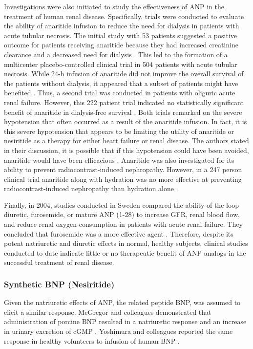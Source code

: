 \documentclass[14pt,a4paper,onecolumn]{extarticle}
\begin{document}
Investigations were also initiated to study the effectiveness of ANP in the treatment of human renal disease. Specifically, trials were conducted to evaluate the ability of anaritide infusion to reduce the need for dialysis in patients with acute tubular necrosis. The initial study with 53 patients suggested a positive outcome for patients receiving anaritide because they had increased creatinine clearance and a decreased need for dialysis \citep{Rahman1994}. This led to the formation of a multicenter placebo-controlled clinical trial in 504 patients with acute tubular necrosis. While 24-h infusion of anaritide did not improve the overall survival of the patients without dialysis, it appeared that a subset of patients might have benefited \citep{Allgren1997}.
Thus, a second trial was conducted in patients with oliguric acute renal failure. However, this 222 patient trial indicated no statistically significant benefit of anaritide in dialysis-free survival \citep{Lewis2000}. Both trials remarked on the severe hypotension that often occurred as a result of the anaritide infusion. In fact, it is this severe hypotension that appears to be limiting the utility of anaritide or nesiritide as a therapy for either heart failure or renal disease. The authors stated in their discussion, it is possible that if this hypotension could have been avoided, anaritide would have been efficacious \citep{Lewis2000}.  Anaritide was also investigated for its ability to prevent radiocontrast-induced nephropathy. However, in a 247 person clinical trial anaritide along with hydration was no more effective at preventing radiocontrast-induced nephropathy than hydration alone \citep{Kurnik1998}.

Finally, in 2004, studies conducted in Sweden compared the ability of the loop diuretic, furosemide, or mature ANP (1-28) to increase GFR, renal blood flow, and reduce renal oxygen consumption in patients with acute renal failure. They concluded that furosemide was a more effective agent \citep{Sward2005}. Therefore, despite its potent natriuretic and diuretic effects in normal, healthy subjects, clinical studies conducted to date indicate little or no therapeutic benefit of ANP analogs in the successful treatment of renal disease.

\subsubsection{Synthetic BNP (Nesiritide)}
Given the natriuretic effects of ANP, the related peptide BNP, was assumed to elicit a similar response. McGregor and colleagues demonstrated that administration of porcine BNP resulted in a natriuretic response and an increase in urinary excretion of cGMP \citep{McGregor1990}. Yoshimura and colleagues reported the same response in healthy volunteers to infusion of human BNP \citep{Yoshimura1991}.
\end{document}
